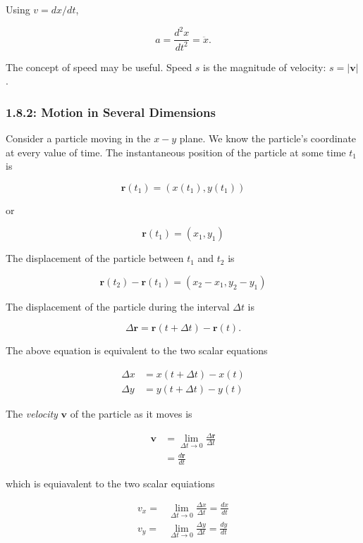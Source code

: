 \documentclass[12pt,twoside]{article}
\begin{document}
\begin{flushleft}
Using $v = dx/dt$,

$$
a = \frac{d^2x}{dt^2} = \ddot{x}.
$$

The concept of speed may be useful. Speed $s$ is the magnitude of velocity: $s = |\mathbf{v}|$.

\subsubsection*{1.8.2: Motion in Several Dimensions}

Consider a particle moving in the $x-y$ plane. We know the particle's coordinate at every value of time. The instantaneous position of the particle
at some time $t_{1}$ is

$$
\mathbf{r}(t_{1}) = \left(x(t_{1}), y(t_{1})\right)
$$

or

$$
\mathbf{r}(t_{1}) = (x_{1},y_{1})
$$

The displacement of the particle between $t_1$ and $t_2$ is

$$
\mathbf{r}(t_2) - \mathbf{r}(t_1) = (x_2 - x_1, y_2 - y_1)
$$

The displacement of the particle during the interval $\Delta t$ is

$$
\Delta\mathbf{r} = \mathbf{r}(t + \Delta t) - \mathbf{r}(t).
$$

The above equation is equivalent to the two scalar equations

\begin{align*}
\Delta x &= x(t + \Delta t) - x(t) \\
\Delta y &= y(t + \Delta t) - y(t)
\end{align*}

The \textit{velocity} $\mathbf{v}$ of the particle as it moves is

\begin{align*}
  \mathbf{v} &= \lim_{\Delta t \rightarrow 0}\frac{\Delta \mathbf{r}}{\Delta t} \\
             &= \frac{d\mathbf{r}}{dt}
\end{align*}

which is equiavalent to the two scalar equiations

\begin{align*}
  v_x = &\lim_{\Delta t \rightarrow 0}\frac{\Delta x}{\Delta t} = \frac{dx}{dt} \\
  v_y = &\lim_{\Delta t \rightarrow 0}\frac{\Delta y}{\Delta t} = \frac{dy}{dt} \\
\end{align*}


\end{flushleft}
\end{document}
